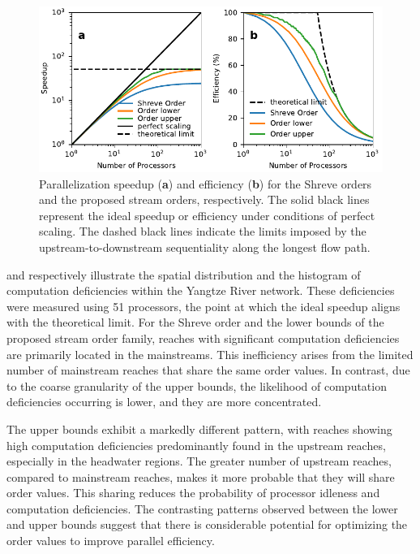 \documentclass[water,article,submit,pdftex,moreauthors]{Definitions/mdpi}
\begin{document}
\begin{figure}[H]
	\includegraphics[width=13.5cm]{fig/speedup_yangtze.pdf}
	\caption{Parallelization speedup (\textbf{a}) and efficiency (\textbf{b}) for the Shreve orders and the proposed stream orders, respectively. The solid black lines represent the ideal speedup or efficiency under conditions of perfect scaling. The dashed black lines indicate the limits imposed by the upstream-to-downstream sequentiality along the longest flow path. \label{fig:scalability_yangtze}}
\end{figure}

 and  respectively illustrate the spatial distribution and the histogram of computation deficiencies within the Yangtze River network. These deficiencies were measured using 51 processors, the point at which the ideal speedup aligns with the theoretical limit. For the Shreve order and the lower bounds of the proposed stream order family, reaches with significant computation deficiencies are primarily located in the mainstreams. This inefficiency arises from the limited number of mainstream reaches that share the same order values. In contrast, due to the coarse granularity of the upper bounds, the likelihood of computation deficiencies occurring is lower, and they are more concentrated.

The upper bounds exhibit a markedly different pattern, with reaches showing high computation deficiencies predominantly found in the upstream reaches, especially in the headwater regions. The greater number of upstream reaches, compared to mainstream reaches, makes it more probable that they will share order values. This sharing reduces the probability of processor idleness and computation deficiencies. The contrasting patterns observed between the lower and upper bounds suggest that there is considerable potential for optimizing the order values to improve parallel efficiency.
\end{document}
